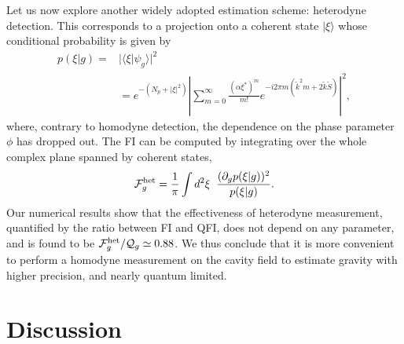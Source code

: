 \documentclass[aps,twocolumn,preprintnumbers,amsmath,amssymb]{revtex4}
\begin{document}
Let us now explore another widely adopted estimation scheme: heterodyne detection. This corresponds to a projection onto a coherent state $|\xi\rangle$ whose conditional probability is given by
\begin{equation}\begin{split}\label{p-eta}
p(\xi|g)=& |\langle \xi | \psi_g\rangle |^2\\
&=e^{-(N_p+|\xi|^2)}\left|\sum_{m=0}^{\infty}\frac{(\alpha \xi^*)^m}{m!}e^{-i2\pi m(\tilde{k}^2m+2\tilde{k}\tilde{S})}\right|^2,
\end{split}\end{equation}
where, contrary to homodyne detection, the dependence on the phase parameter $\phi$ has dropped out.
The FI can be computed by integrating over the whole complex plane spanned by coherent states,
\begin{equation}
\mathcal{F}^{\rm het}_g=\frac{1}{\pi}\int d^2\xi \;\; \frac{(\partial_{g}p(\xi|g))^2}{p(\xi|g)}.
\end{equation}
Our numerical results show that the effectiveness of heterodyne measurement, quantified by the ratio between FI and QFI, does not depend on any parameter, and is found to be $\mathcal{F}^{\rm het}_g/\mathcal{Q}_g \simeq 0.88$. We thus  conclude that it is more convenient to perform a homodyne measurement on the cavity field to estimate gravity with higher precision, and nearly quantum limited.

\section{Discussion}
\end{document}

